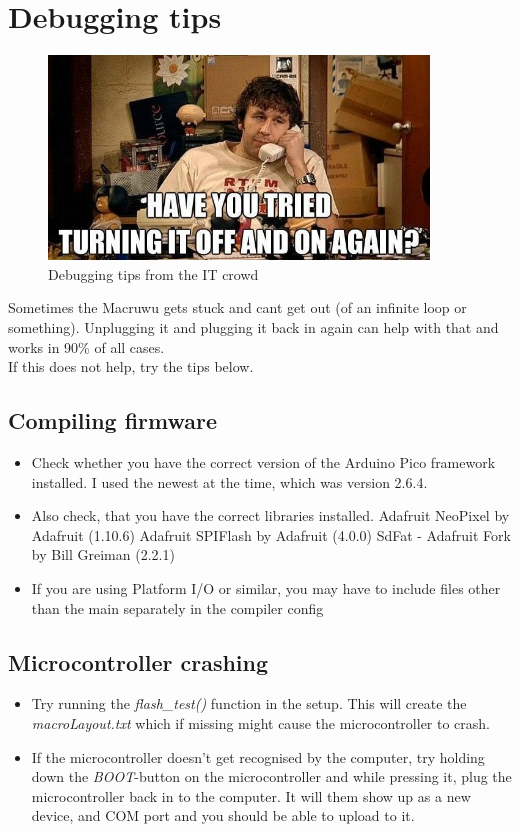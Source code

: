 \documentclass[english, 12pt]{scrartcl}
\begin{document}
	\section{Debugging tips}
	\begin{figure}[H]
		\centering
		\includegraphics[width=0.9\textwidth]{debugging}
		\caption{Debugging tips from the IT crowd}
	\end{figure}
	Sometimes the Macruwu gets stuck and cant get out (of an infinite loop or something). Unplugging it and plugging it back in again can help with that and works in 90\% of all cases.\\
	If this does not help, try the tips below.
	\subsection{Compiling firmware}
	\begin{itemize}
		\item Check whether you have the correct version of the Arduino Pico framework installed. I used the newest at the time, which was version 2.6.4.
		\item Also check, that you have the correct libraries installed.
		\subitem Adafruit NeoPixel by Adafruit (1.10.6)
		\subitem Adafruit SPIFlash by Adafruit (4.0.0)
		\subitem SdFat - Adafruit Fork by Bill Greiman (2.2.1)
		\item If you are using Platform I/O or similar, you may have to include files other than the main separately in the compiler config
	\end{itemize}
	\subsection{Microcontroller crashing}
	\begin{itemize}
		\item Try running the \textit{flash\_test()} function in the setup. This will create the \textit{macroLayout.txt} which if missing might cause the microcontroller to crash.
		\item If the microcontroller doesn't get recognised by the computer, try holding down the \textit{BOOT}-button on the microcontroller and while pressing it, plug the microcontroller back in to the computer. It will them show up as a new device, and COM port and you should be able to upload to it.
	\end{itemize}
\end{document}
